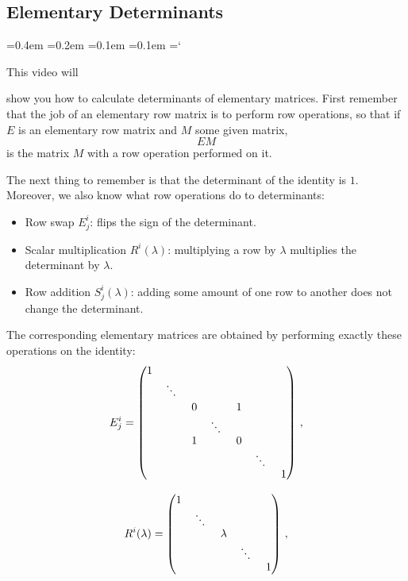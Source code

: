 
\subsection*{Elementary Determinants}

{\ttfamily
{}\font=0.4em
\font=0.2em
\font=0.1em
\font=0.1em
\hyphenchar\font=`\-


\hypertarget{scripts_elementary_matrices_determinants_ii_dets}{This video will}
show you how to calculate determinants of elementary matrices.
First remember that the job of an elementary row matrix is to perform row operations, 
so that if $E$ is an elementary row matrix and $M$ some given matrix,
\[EM\]
is the matrix $M$ with a row operation performed on it. 

The next thing to remember is that the determinant of the identity is $1$.
Moreover, we also know what row operations do to determinants:
\begin{itemize} 
\item Row swap $E^i_j$: flips the sign of the determinant.
\item Scalar multiplication $R^i(\lambda)$: multiplying a row by $\lambda$ multiplies the determinant by $\lambda$.
\item Row addition $S^i_j(\lambda)$: adding some amount of one row to another does not change the determinant.
\end{itemize}
The corresponding elementary matrices are obtained by performing exactly these operations on the identity:
\[
E^i_j=\begin{pmatrix}
1 & & & & & & \\
& \rotatebox{-15}{$\ddots$} & & & & & \\[1mm]
& & 0 & & 1 & & \\
& & & \rotatebox{-15}{$\ddots$} & & & \\
& & 1 & & 0 & & \\
& & & & & \rotatebox{-15}{$\ddots$}& \\
& & & & & & 1 \\
\end{pmatrix}\, ,
\]

\[
R^i(\lambda)=
\begin{pmatrix}
1 & & & & \\
  & \rotatebox{-15}{$\ddots$} & & & \\
  & & \lambda & & \\
  & & & \rotatebox{-15}{$\ddots$} & \\
  & & & & 1 \\
\end{pmatrix}
\, ,\]

}
